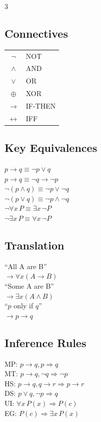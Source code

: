 \documentclass[8pt,a4paper]{article}
\begin{document}
\begin{multicols}{3}

\subsection*{Connectives}
\begin{center}
\scriptsize
\begin{tabular}{c|l}
$\neg$ & NOT \\
$\land$ & AND \\
$\lor$ & OR \\
$\oplus$ & XOR \\
$\to$ & IF-THEN \\
$\leftrightarrow$ & IFF \\
\end{tabular}
\end{center}

\subsection*{Key Equivalences}
$p \to q \equiv \neg p \lor q$\\
$p \to q \equiv \neg q \to \neg p$\\
$\neg(p \land q) \equiv \neg p \lor \neg q$\\
$\neg(p \lor q) \equiv \neg p \land \neg q$\\
$\neg \forall x\, P \equiv \exists x\, \neg P$\\
$\neg \exists x\, P \equiv \forall x\, \neg P$

\subsection*{Translation}
``All A are B''\\
$\to \forall x(A \to B)$\\[3pt]
``Some A are B''\\
$\to \exists x(A \land B)$\\[3pt]
``$p$ only if $q$''\\
$\to p \to q$

\subsection*{Inference Rules}
MP: $p \to q, p \Rightarrow q$\\
MT: $p \to q, \neg q \Rightarrow \neg p$\\
HS: $p \to q, q \to r \Rightarrow p \to r$\\
DS: $p \lor q, \neg p \Rightarrow q$\\
UI: $\forall x\, P(x) \Rightarrow P(c)$\\
EG: $P(c) \Rightarrow \exists x\, P(x)$


\end{multicols}
\end{document}
